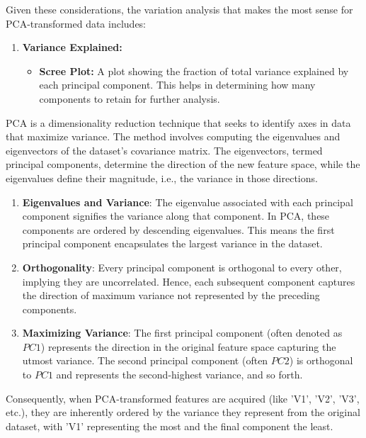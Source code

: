 Given these considerations, the variation analysis that makes the most sense for PCA-transformed data includes:

\begin{enumerate}
    \item \textbf{Variance Explained:}
          \begin{itemize}
              \item \textbf{Scree Plot:} A plot showing the fraction of total variance explained by each principal component. This helps in determining how many components to retain for further analysis.
          \end{itemize}
\end{enumerate}

PCA is a dimensionality reduction technique that seeks to identify axes in data that maximize variance. The method involves computing the eigenvalues and eigenvectors of the dataset's covariance matrix. The eigenvectors, termed principal components, determine the direction of the new feature space, while the eigenvalues define their magnitude, i.e., the variance in those directions.


\begin{enumerate}
    \item \textbf{Eigenvalues and Variance}: The eigenvalue associated with each principal component signifies the variance along that component. In PCA, these components are ordered by descending eigenvalues. This means the first principal component encapsulates the largest variance in the dataset.

    \item \textbf{Orthogonality}: Every principal component is orthogonal to every other, implying they are uncorrelated. Hence, each subsequent component captures the direction of maximum variance not represented by the preceding components.

    \item \textbf{Maximizing Variance}: The first principal component (often denoted as \( PC1 \)) represents the direction in the original feature space capturing the utmost variance. The second principal component (often \( PC2 \)) is orthogonal to \( PC1 \) and represents the second-highest variance, and so forth.
\end{enumerate}

Consequently, when PCA-transformed features are acquired (like 'V1', 'V2', 'V3', etc.), they are inherently ordered by the variance they represent from the original dataset, with 'V1' representing the most and the final component the least.





